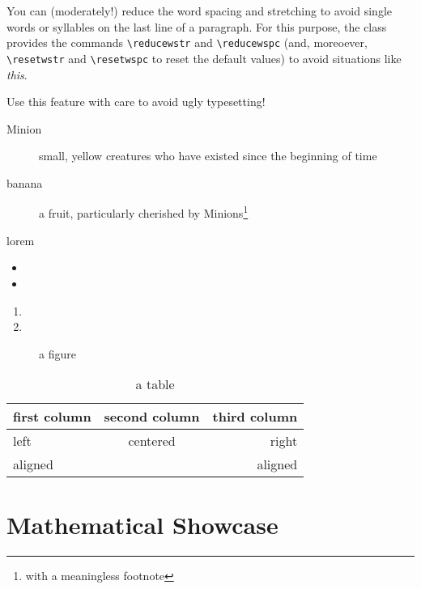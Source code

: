 \reducewspc[.9] You can (moderately!) reduce the word spacing and stretching to avoid single words or syllables on the last line of a paragraph. For this purpose, the class provides the commands \verb|\reducewstr| and \verb|\reducewspc| (and, moreoever, \verb|\resetwstr| and \verb|\resetwspc| to reset the default values) to avoid situations like \emph{this}.\resetwspc

Use this feature with care to avoid ugly typesetting!


\begin{description}
   \item[Minion] small, yellow creatures who have existed since the beginning of time
   \item[banana] a fruit, particularly cherished by Minions\footnote{with a meaningless footnote}
   \item[lorem] \blindtext
\end{description}

\begin{itemize}
	\item \blindtext
	\item \blindtext
\end{itemize}

\begin{enumerate}
	\item \blindtext
	\item \blindtext
\end{enumerate}

\begin{figure}\centering %
\caption{a figure}%
\label{fig:foo}%
\end{figure}

\begin{table}\centering%
\begin{tabular}{lcr}
\toprule
   first column   & second column   & third column
\\
\midrule
   left           & centered        & right
\\
   aligned        &                 & aligned
\\
\bottomrule
\end{tabular}
\caption{a table}
\label{tab:bar}
\end{table}

\chapter{Mathematical Showcase}

